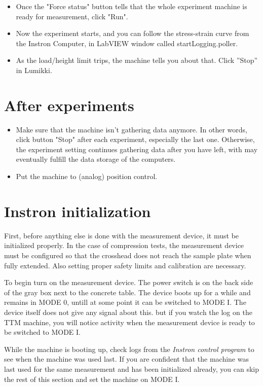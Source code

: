 \documentclass[a4paper]{article}
\begin{document}
\begin{itemize}
  \item Once the "Force status" button tells that the whole experiment machine is ready for measurement, click "Run".
  \item Now the experiment starts, and you can follow the stress-strain curve from the Instron Computer, in LabVIEW  window called startLogging.poller.
  \item As the load/height limit trips, the machine tells you about that. Click ''Stop'' in Lumikki.
\end{itemize}

\section{After experiments}

\begin{itemize}
  \item Make sure that the machine isn't gathering data anymore. In other words, click button "Stop" after each experiment, especially the last one. Otherwise, the experiment setting continues gathering data after you have left, with may eventually fulfill the data storage of the computers.
  \item Put the machine to (analog) position control.
\end{itemize}

\clearpage

\section{Instron initialization}

First, before anything else is done with the measurement device, it
must be initialized properly. In the case of compression tests, the
measurement device must be configured so that the crosshead does not
reach the sample plate when fully extended. Also setting proper safety
limits and calibration are necessary.


To begin turn on the measurement device. The power switch is on the
back side of the gray box next to the concrete table. The device boots
up for a while and remains in \textsf{MODE 0}, untill at some point it
can be switched to \textsf{MODE I}. The device itself does not give
any signal about this. but if you watch the log on the TTM machine,
you will notice activity when the measurement device is ready to be
switched to \textsf{MODE I}.

While the machine is booting up, check logs from the {\it Instron
control program} to see when the machine was used last. If you are
confident that the machine was last used for the same measurement and
has been initialized already, you can skip the rest of this section
and set the machine on \textsf{MODE I}.
\end{document}
